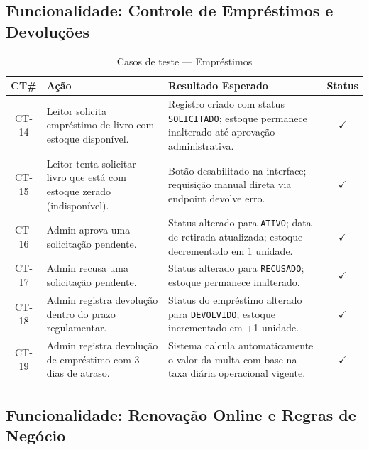 \subsection{Funcionalidade: Controle de Empréstimos e Devoluções}

\begin{table}[h!]
	\centering
	\caption{Casos de teste --- Empréstimos}
	\label{tab:teste_emprestimos}
	\begin{tabular}{|c|p{6cm}|p{6cm}|c|}
		\hline
		\textbf{CT\#} & \textbf{Ação} & \textbf{Resultado Esperado} & \textbf{Status} \\ \hline
		CT-14 & Leitor solicita empréstimo de livro com estoque disponível. & Registro criado com status \texttt{SOLICITADO}; estoque permanece inalterado até aprovação administrativa. & $\checkmark$ \\ \hline
		CT-15 & Leitor tenta solicitar livro que está com estoque zerado (indisponível). & Botão desabilitado na interface; requisição manual direta via endpoint devolve erro. & $\checkmark$ \\ \hline
		CT-16 & Admin aprova uma solicitação pendente. & Status alterado para \texttt{ATIVO}; data de retirada atualizada; estoque decrementado em 1 unidade. & $\checkmark$ \\ \hline
		CT-17 & Admin recusa uma solicitação pendente. & Status alterado para \texttt{RECUSADO}; estoque permanece inalterado. & $\checkmark$ \\ \hline
		CT-18 & Admin registra devolução dentro do prazo regulamentar. & Status do empréstimo alterado para \texttt{DEVOLVIDO}; estoque incrementado em +1 unidade. & $\checkmark$ \\ \hline
		CT-19 & Admin registra devolução de empréstimo com 3 dias de atraso. & Sistema calcula automaticamente o valor da multa com base na taxa diária operacional vigente. & $\checkmark$ \\ \hline
	\end{tabular}
\end{table}

\subsection{Funcionalidade: Renovação Online e Regras de Negócio}

